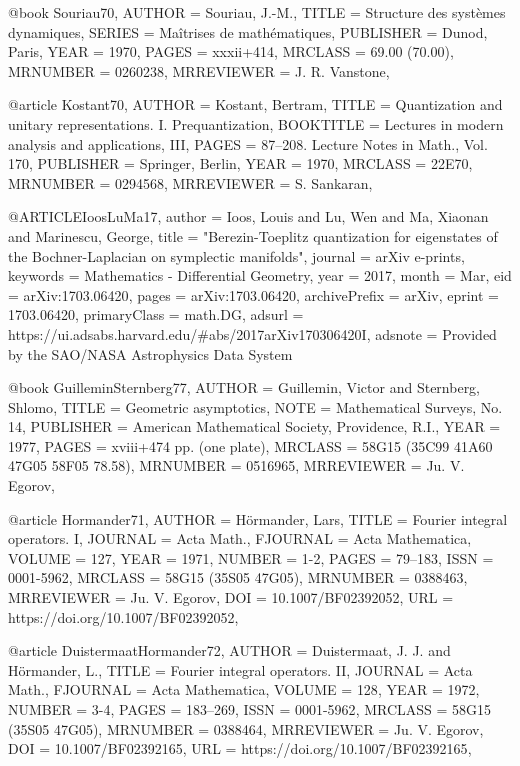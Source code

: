 @book {Souriau70,
    AUTHOR = {Souriau, J.-M.},
     TITLE = {Structure des syst\`emes dynamiques},
    SERIES = {Ma\^{i}trises de math\'{e}matiques},
 PUBLISHER = {Dunod, Paris},
      YEAR = {1970},
     PAGES = {xxxii+414},
   MRCLASS = {69.00 (70.00)},
  MRNUMBER = {0260238},
MRREVIEWER = {J. R. Vanstone},
}

@article {Kostant70,
    AUTHOR = {Kostant, Bertram},
     TITLE = {Quantization and unitary representations. {I}.
              {P}requantization},
 BOOKTITLE = {Lectures in modern analysis and applications, {III}},
     PAGES = {87--208. Lecture Notes in Math., Vol. 170},
 PUBLISHER = {Springer, Berlin},
      YEAR = {1970},
   MRCLASS = {22E70},
  MRNUMBER = {0294568},
MRREVIEWER = {S. Sankaran},
}

@ARTICLE{IoosLuMa17,
       author = {{Ioos}, Louis and {Lu}, Wen and {Ma}, Xiaonan and {Marinescu}, George},
        title = "{Berezin-Toeplitz quantization for eigenstates of the Bochner-Laplacian on symplectic manifolds}",
      journal = {arXiv e-prints},
     keywords = {Mathematics - Differential Geometry},
         year = 2017,
        month = Mar,
          eid = {arXiv:1703.06420},
        pages = {arXiv:1703.06420},
archivePrefix = {arXiv},
       eprint = {1703.06420},
 primaryClass = {math.DG},
       adsurl = {https://ui.adsabs.harvard.edu/\#abs/2017arXiv170306420I},
      adsnote = {Provided by the SAO/NASA Astrophysics Data System}
}

@book {GuilleminSternberg77,
    AUTHOR = {Guillemin, Victor and Sternberg, Shlomo},
     TITLE = {Geometric asymptotics},
      NOTE = {Mathematical Surveys, No. 14},
 PUBLISHER = {American Mathematical Society, Providence, R.I.},
      YEAR = {1977},
     PAGES = {xviii+474 pp. (one plate)},
   MRCLASS = {58G15 (35C99 41A60 47G05 58F05 78.58)},
  MRNUMBER = {0516965},
MRREVIEWER = {Ju. V. Egorov},
}

@article {Hormander71,
    AUTHOR = {H\"{o}rmander, Lars},
     TITLE = {Fourier integral operators. {I}},
   JOURNAL = {Acta Math.},
  FJOURNAL = {Acta Mathematica},
    VOLUME = {127},
      YEAR = {1971},
    NUMBER = {1-2},
     PAGES = {79--183},
      ISSN = {0001-5962},
   MRCLASS = {58G15 (35S05 47G05)},
  MRNUMBER = {0388463},
MRREVIEWER = {Ju. V. Egorov},
       DOI = {10.1007/BF02392052},
       URL = {https://doi.org/10.1007/BF02392052},
}

@article {DuistermaatHormander72,
    AUTHOR = {Duistermaat, J. J. and H\"{o}rmander, L.},
     TITLE = {Fourier integral operators. {II}},
   JOURNAL = {Acta Math.},
  FJOURNAL = {Acta Mathematica},
    VOLUME = {128},
      YEAR = {1972},
    NUMBER = {3-4},
     PAGES = {183--269},
      ISSN = {0001-5962},
   MRCLASS = {58G15 (35S05 47G05)},
  MRNUMBER = {0388464},
MRREVIEWER = {Ju. V. Egorov},
       DOI = {10.1007/BF02392165},
       URL = {https://doi.org/10.1007/BF02392165},
}

